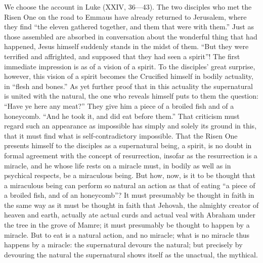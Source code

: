 \documentclass[12pt]{book}
\newcommand{\opage}[1]{\marginnote{\footnotesize\textit{[#1]}}}
\begin{document}
We choose the account in Luke (XXIV, 36---43). The two disciples who met
the Risen One on the road to Emmaus have already returned to Jerusalem,
where they find ``the eleven gathered together, and them that were with
them.'' Just as those assembled are absorbed in conversation about the
wonderful thing that had happened, Jesus himself suddenly stands in the
midst of them. ``But they were terrified and affrighted, and supposed
that they had seen a spirit''! The first immediate impression is as of
a vision of a spirit. To the disciples' great surprise, however, this
vision of a spirit becomes the Crucified himself in bodily actuality, in
``flesh and bones.'' As yet further proof that in this actuality the
supernatural is united with the natural, the one who reveals himself
puts to them the question: ``Have ye here any meat?'' They give him a
piece of a broiled fish and of a honeycomb. ``And he took it, and did
eat before them.'' That criticism must regard such an appearance as
impossible has simply
\opage{165}\setcounter{footnote}{0}%
and solely its ground in this, that it must find what is
self-contradictory impossible. That the Risen One presents himself to
the disciples as a supernatural being, a spirit, is no doubt in formal
agreement with the concept of resurrection, insofar as the resurrection
is a miracle, and he whose life rests on a miracle must, in bodily as
well as in psychical respects, be a miraculous being. But how, now, is
it to be thought that a miraculous being can perform so natural an
action as that of eating ``a piece of a broiled fish, and of an
honeycomb''? It must presumably be thought in faith in the same way as
it must be thought in faith that Jehovah, the almighty creator of heaven
and earth, actually ate actual curds and actual veal with Abraham under
the tree in the grove of Mamre; it must presumably be thought to happen
by a miracle. But to eat is a natural action, and no miracle; what is no
miracle thus happens by a miracle: the supernatural devours the natural;
but precisely by devouring the natural the supernatural shows itself as
the unactual, the mythical.
\end{document}
